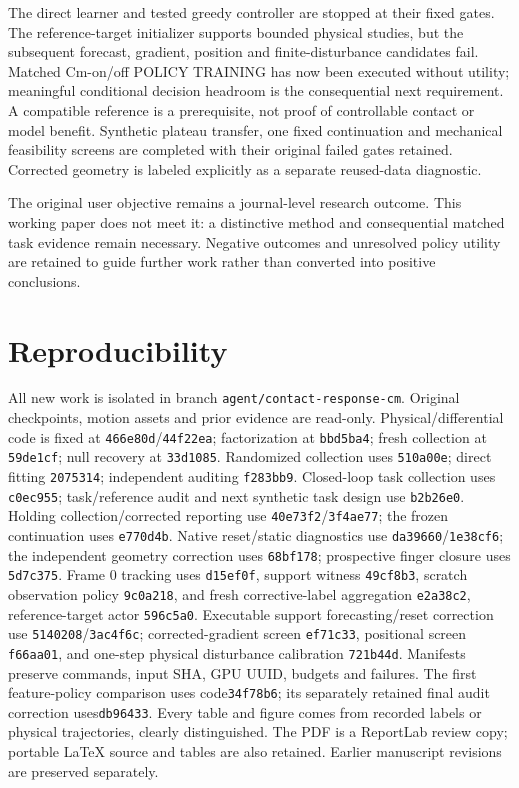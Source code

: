 \documentclass[10pt]{article}
\begin{document}
The direct learner and tested greedy controller are stopped at their fixed gates.
The reference-target initializer supports bounded physical studies, but the
subsequent forecast, gradient, position and finite-disturbance candidates fail.
Matched Cm-on/off POLICY TRAINING has now been executed without utility;
meaningful conditional decision headroom is the consequential next requirement. A compatible reference is a
prerequisite, not proof of controllable contact or model benefit. Synthetic plateau transfer, one fixed continuation and mechanical feasibility
screens are completed with their original failed gates retained. Corrected geometry
is labeled explicitly as a separate reused-data diagnostic.

The original user objective remains a journal-level research outcome. This working
paper does not meet it: a distinctive method and consequential matched task evidence
remain necessary. Negative outcomes and unresolved policy utility are retained
to guide further work rather than converted into positive conclusions.

\section*{Reproducibility}
All new work is isolated in branch \texttt{agent/contact-response-cm}. Original
checkpoints, motion assets and prior evidence are read-only. Physical/differential
code is fixed at \texttt{466e80d}/\texttt{44f22ea}; factorization at
\texttt{bbd5ba4}; fresh collection at \texttt{59de1cf}; null recovery at
\texttt{33d1085}. Randomized collection uses \texttt{510a00e}; direct fitting
\texttt{2075314}; independent auditing \texttt{f283bb9}. Closed-loop task
collection uses \texttt{c0ec955}; task/reference audit and next synthetic task
design use \texttt{b2b26e0}. Holding collection/corrected reporting use
\texttt{40e73f2}/\texttt{3f4ae77}; the frozen continuation uses \texttt{e770d4b}.
Native reset/static diagnostics use \texttt{da39660}/\texttt{1e38cf6}; the independent
geometry correction uses \texttt{68bf178}; prospective finger closure uses \texttt{5d7c375}. Frame 0 tracking uses \texttt{d15ef0f},
support witness \texttt{49cf8b3}, scratch observation policy \texttt{9c0a218}, and
fresh corrective-label aggregation \texttt{e2a38c2}, reference-target actor \texttt{596c5a0}.
Executable support forecasting/reset correction use \texttt{5140208}/\texttt{3ac4f6c};
corrected-gradient screen \texttt{ef71c33}, positional screen \texttt{f66aa01},
and one-step physical disturbance calibration \texttt{721b44d}.
Manifests preserve commands, input SHA, GPU UUID,
budgets and failures. The first feature-policy comparison uses code\texttt{34f78b6}; its separately
retained final audit correction uses\texttt{db96433}.
Every table and figure comes from recorded labels or physical trajectories, clearly distinguished.
The PDF is a ReportLab review copy; portable LaTeX source and tables are also
retained. Earlier manuscript revisions are preserved separately.
\end{document}
